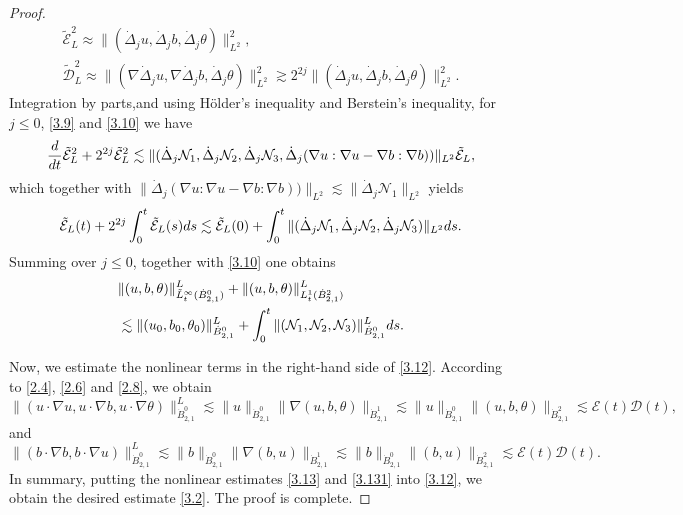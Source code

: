 \documentclass[10pt,a4paper]{amsart}
\numberwithin{equation}{section}
\begin{document}
\begin{proof}
\begin{equation}
\begin{gathered}
 \tilde{\mathcal{E}}_L^2\approx\|(\dot{\Delta}_ju,\dot{\Delta}_jb,\dot{\Delta}_j\theta)
 \|_{L^2}^2, \\
 \tilde{\mathcal{D}}_L^2\approx\|(\nabla\dot{\Delta}_ju,\nabla\dot{\Delta}_jb,
 \dot{\Delta}_j\theta)\|_{L^2}^2\gtrsim 2^{2j}\|(\dot{\Delta}_ju,\dot{\Delta}_jb,
 \dot{\Delta}_j\theta)\|_{L^2}^2.
\end{gathered}
\end{equation}
Integration by parts,and using  H\"older's inequality and Berstein's inequality,
for $j\leqslant 0$, \eqref{3.9} and \eqref{3.10} we have
\[
 \frac{\rm d}{{\rm d}t}\tilde{\mathcal{E}}_L^2+2^{2j}
 \tilde{\mathcal{E}}_L^2\lesssim\|(\dot{\Delta}_j 
 \mathcal{N}_1,\dot{\Delta}_j \mathcal{N}_2,
 \dot{\Delta}_j \mathcal{N}_3,\dot{\Delta}_j (\nabla u:\nabla u-\nabla b:\nabla b))
 \|_{L^2}\tilde{\mathcal{E}}_L,
\]
which together with $\|\dot{\Delta}_j (\nabla u:\nabla u
-\nabla b:\nabla b))\|_{L^2}\lesssim\|\dot{\Delta}_j\mathcal{N}_1\|_{L^2}$
yields
\begin{equation}\label{3.11}
 \tilde{\mathcal{E}}_L(t)+2^{2j}\int_0^t\tilde{\mathcal{E}}_L(s){\rm d}s\lesssim\tilde{\mathcal{E}}_L(0)+\int_0^t\|(\dot{\Delta}_j \mathcal{N}_1,\dot{\Delta}_j \mathcal{N}_2,\dot{\Delta}_j \mathcal{N}_3)\|_{L^2}{\rm d}s.
\end{equation}
Summing over $j\leqslant 0$, together with \eqref{3.10} one obtains
 \begin{equation}\label{3.12}
\begin{aligned}
&\|(u,b,\theta)\|_{\tilde{L}^\infty_t(\dot{B}^0_{2,1})}^L+\|(u,b,\theta)
\|_{{L}^1_t(\dot{B}^2_{2,1})}^L \\
&\lesssim\|(u_0,b_0,\theta_0)\|_{\dot{B}^0_{2,1}}^L+\int_0^t\|( \mathcal{N}_1,
\mathcal{N}_2, \mathcal{N}_3)\|_{\dot{B}^0_{2,1}}^L{\rm d}s.
\end{aligned}
\end{equation}

Now, we estimate the nonlinear terms in the right-hand side of \eqref{3.12}.
According to \eqref{2.4}, \eqref{2.6} and \eqref{2.8}, we obtain
\begin{equation}\label{3.13}
 \|(u\cdot\nabla u,u\cdot\nabla b,u\cdot\nabla \theta)\|_{\dot{B}^0_{2,1}}^L
 \lesssim \|u\|_{{\dot{B}^0_{2,1}}}\|\nabla(u,b,\theta)\|_{{\dot{B}^1_{2,1}}}
 \lesssim \|u\|_{{\dot{B}^0_{2,1}}}\|(u,b,\theta)\|_{{\dot{B}^2_{2,1}}}
 \lesssim \mathcal{E}(t)\mathcal{D}(t),
\end{equation}
and
\begin{equation}\label{3.131}
 \|(b\cdot\nabla b,b\cdot\nabla u)\|_{\dot{B}^0_{2,1}}^L
 \lesssim \|b\|_{{\dot{B}^0_{2,1}}}\|\nabla(b,u)\|_{{\dot{B}^1_{2,1}}}
 \lesssim \|b\|_{{\dot{B}^0_{2,1}}}\|(b,u)\|_{{\dot{B}^2_{2,1}}}
 \lesssim \mathcal{E}(t)\mathcal{D}(t).
\end{equation}
In summary, putting the nonlinear estimates \eqref{3.13} and \eqref{3.131} into
\eqref{3.12}, we obtain the desired estimate \eqref{3.2}. The proof is complete.
 \end{proof}
\end{document}
